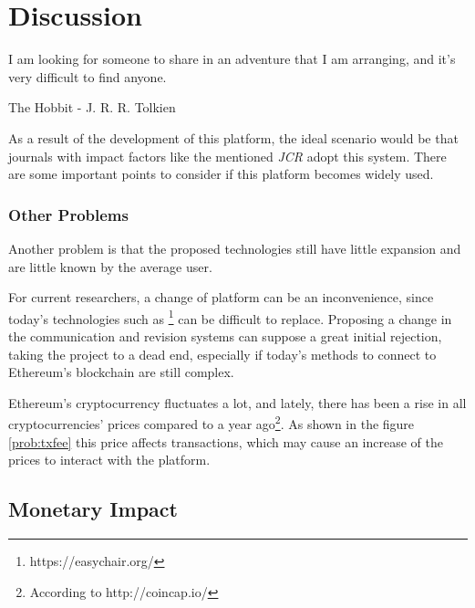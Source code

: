 \chapter{Discussion}

\begin{FraseCelebre}
    \begin{Frase}
        I am looking for someone to share in an adventure that I am arranging, and
        it's very difficult to find anyone.
    \end{Frase}
    \begin{Fuente}
        The Hobbit - J. R. R. Tolkien
    \end{Fuente}
\end{FraseCelebre}

As a result of the development of this platform, the ideal scenario would be that journals with impact factors like the mentioned \emph{JCR} adopt this system.
There are some important points to consider if this platform becomes widely used.



\subsection{Other Problems}
\label{sec:other-problems}


Another problem is that the proposed technologies still have little expansion and are little known by the average user.

For current researchers, a change of platform can be an inconvenience, since today's technologies such as \footnote{https://easychair.org/} can be difficult to replace. Proposing a change in the communication and revision systems can suppose a great initial rejection, taking the project to a dead end, especially if today's methods to connect to Ethereum's blockchain are still complex.

Ethereum's cryptocurrency fluctuates a lot, and lately, there has been a rise in all cryptocurrencies' prices compared to a year ago\footnote{According to http://coincap.io/}. As shown in the figure \ref{prob:txfee} this price affects transactions, which may cause an increase of the prices to interact with the platform.


\section{Monetary Impact}
\label{sec:monetary-impact}

